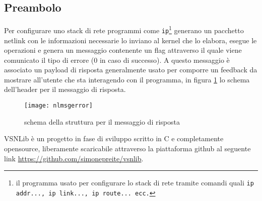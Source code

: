 \subsection{Preambolo}
Per configurare uno stack di rete programmi come {\tt {ip}}\footnote{il programma usato per configurare lo stack di rete tramite comandi quali {\tt {ip addr...}, \tt {ip link...}, \tt {ip route...} ecc.}} generano un pacchetto netlink con le informazioni necessarie lo inviano al kernel che lo elabora, esegue le operazioni e genera un messaggio contenente un flag attraverso il quale viene comunicato il tipo di errore (0 in caso di successo). A questo messaggio \`e associato un payload di risposta generalmente usato per comporre un feedback da mostrare all'utente che sta interagendo con il programma, in figura \ref{fig:nlmserror} lo schema dell'header per il messaggio di risposta.\\
\begin{figure}[h]                       %
\begin{center}                          %
\texttt{[image: nlmsgerror]}%
%
\caption[struct nlmserror]{schema della struttura per il messaggio di risposta}\label{fig:nlmserror}
\end{center}
\end{figure}
VSNLib \`e un progetto in fase di sviluppo scritto in C e completamente opensource, liberamente scaricabile attraverso la piattaforma github al seguente link \url{https://github.com/simonepreite/vsnlib}.

